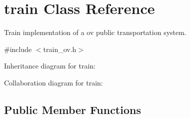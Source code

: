 \hypertarget{classtrain}{}\section{train Class Reference}
\label{classtrain}


Train implementation of a ov public transportation system.  




{\ttfamily \#include $<$train\+\_\+ov.\+h$>$}



Inheritance diagram for train\+:


Collaboration diagram for train\+:
\subsection*{Public Member Functions}
